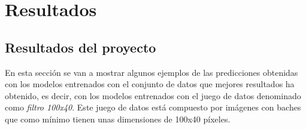 \section{Resultados}
\label{sec:resultados}

\subsection{Resultados del proyecto}

En esta sección se van a mostrar algunos ejemplos de las predicciones obtenidas con los modelos entrenados con el conjunto de datos que mejores resultados ha obtenido, es decir, con los modelos entrenados con el juego de datos denominado como \textit{filtro 100x40}. Este juego de datos está compuesto por imágenes con baches que como mínimo tienen unas dimensiones de 100x40 píxeles.

